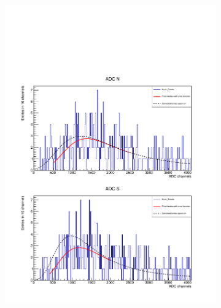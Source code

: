 \begin{figure}[ht]
  \centering
  \begin{subfigure}{0.7\linewidth}
    \includegraphics[width=\linewidth{}]{./fig/70M6CorrectedLandau.pdf}
    \caption{}
    \label{fig:2HistoM6}
  \end{subfigure}
  \begin{subfigure}{0.7\linewidth}

\end{subfigure}
\end{figure}

